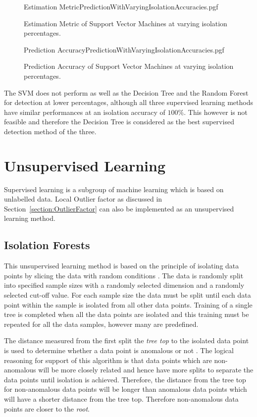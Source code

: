 \begin{figure}[!htb]
	\centering
	{Estimation MetricPredictionWithVaryingIsolationAccuracies.pgf}
	
	\caption{Estimation Metric of Support Vector Machines at varying isolation percentages.}
	\label{fig:SVMWithVaryingIsolationEstimation}
\end{figure}

\begin{figure}[!htb]
	\centering
	{Prediction AccuracyPredictionWithVaryingIsolationAccuracies.pgf}
	
	\caption{Prediction Accuracy of Support Vector Machines at varying isolation percentages.}
	\label{fig:SVMWithVaryingIsolationPrediction}
\end{figure}

The SVM does not perform as well as the Decision Tree and the Random Forest for detection at lower percentages, although all three supervised learning methods have similar performances at an isolation accuracy of $100\%$. This however is not feasible and therefore the Decision Tree is considered as the best supervised detection method of the three.

\section{Unsupervised Learning}
Supervised learning is a subgroup of machine learning which is based on unlabelled data. Local Outlier factor as discussed in Section~\ref{section:OutlierFactor} can also be implemented as an unsupervised learning method.

\subsection{Isolation Forests}
This unsupervised learning method is based on the principle of isolating data points by slicing the data with random conditions \cite{TonyLiu2008}. The data is randomly split into specified sample sizes with a randomly selected dimension and a randomly selected cut-off value. For each sample size the data must be split until each data point within the sample is isolated from all other data points. Training of a single tree is completed when all the data points are isolated and this training must be repeated for all the data samples, however many are predefined. 

The distance measured from the first split the \emph{tree top} to the isolated data point is used to determine whether a data point is anomalous or not \cite{Hariri2021}. The logical reasoning for support of this algorithm is that data points which are non-anomalous will be more closely related and hence have more splits to separate the data points until isolation is achieved. Therefore, the distance from the tree top for non-anomalous data points will be longer than anomalous data points which will have a shorter distance from the tree top. Therefore non-anomalous data points are closer to the \emph{root}. 

